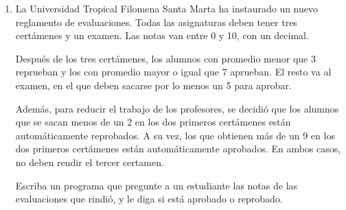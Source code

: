 \documentclass[11pt,spanish]{article}
\newcommand{\pond}[1]{[{\small\textbf{#1\%}}]}
\begin{document}
\begin{enumerate}[font=\Large\bfseries]
    \newpage
    \item
      \pond{25}
      La Universidad Tropical Filomena Santa Marta
      ha instaurado un nuevo reglamento de evaluaciones.
      Todas las asignaturas deben tener tres certámenes y un examen.
      Las notas van entre 0 y 10, con un decimal.

      Después de los tres certámenes,
      los alumnos con promedio menor que 3 reprueban y
      los con promedio mayor o igual que 7 aprueban.
      El resto va al examen,
      en el que deben sacarse por lo menos un 5 para aprobar.

      Además,
      para reducir el trabajo de los profesores,
      se decidió que los alumnos que se sacan menos de un 2
      en los dos primeros certámenes
      están automáticamente reprobados.
      A su vez,
      los que obtienen más de un 9
      en los dos primeros certámenes
      están automáticamente aprobados.
      En ambos casos,
      no deben rendir el tercer certamen.

      Escriba un programa que pregunte a un estudiante
      las notas de las evaluaciones que rindió,
      y le diga si está aprobado o reprobado.

      \begin{minipage}[t]{.2\textwidth}
        
      \end{minipage}
      \hfil
      \begin{minipage}[t]{.2\textwidth}
        
      \end{minipage}
      \hfil
      \begin{minipage}[t]{.2\textwidth}
        
      \end{minipage}
      \hfil
      \begin{minipage}[t]{.2\textwidth}
        
      \end{minipage}


\end{enumerate}
\end{document}
